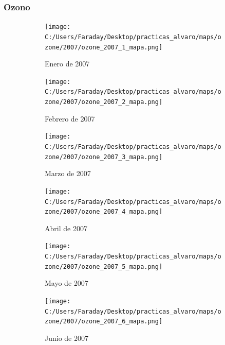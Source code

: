 \documentclass[12pt]{article}
\begin{document}
\newpage

\subsubsection*{Ozono}
%

\begin{figure}[H]
\centering
\begin{subfigure}[h]{0.45\textwidth}
\texttt{[image: C:/Users/Faraday/Desktop/practicas\_alvaro/maps/ozone/2007/ozone\_2007\_1\_mapa.png]}
\caption{Enero de 2007}
\label{fig:map-mon-2-1-2007}
\end{subfigure}
%
\begin{subfigure}[H]{0.45\textwidth}
\texttt{[image: C:/Users/Faraday/Desktop/practicas\_alvaro/maps/ozone/2007/ozone\_2007\_2\_mapa.png]}
\caption{Febrero de 2007}
\label{fig:map-mon-2-2-2007}
\end{subfigure}
\caption{}
\end{figure}

\begin{figure}[H]
\centering
\begin{subfigure}[h]{0.45\textwidth}
\texttt{[image: C:/Users/Faraday/Desktop/practicas\_alvaro/maps/ozone/2007/ozone\_2007\_3\_mapa.png]}
\caption{Marzo de 2007}
\label{fig:map-mon-2-3-2007}
\end{subfigure}
%
\begin{subfigure}[H]{0.45\textwidth}
\texttt{[image: C:/Users/Faraday/Desktop/practicas\_alvaro/maps/ozone/2007/ozone\_2007\_4\_mapa.png]}
\caption{Abril de 2007}
\label{fig:map-mon-2-4-2007}
\end{subfigure}
\caption{}
\end{figure}

\begin{figure}[H]
\centering
\begin{subfigure}[h]{0.45\textwidth}
\texttt{[image: C:/Users/Faraday/Desktop/practicas\_alvaro/maps/ozone/2007/ozone\_2007\_5\_mapa.png]}
\caption{Mayo de 2007}
\label{fig:map-mon-2-5-2007}
\end{subfigure}
%
\begin{subfigure}[H]{0.45\textwidth}
\texttt{[image: C:/Users/Faraday/Desktop/practicas\_alvaro/maps/ozone/2007/ozone\_2007\_6\_mapa.png]}
\caption{Junio de 2007}
\label{fig:map-mon-2-6-2007}
\end{subfigure}
\caption{}
\end{figure}
\end{document}

